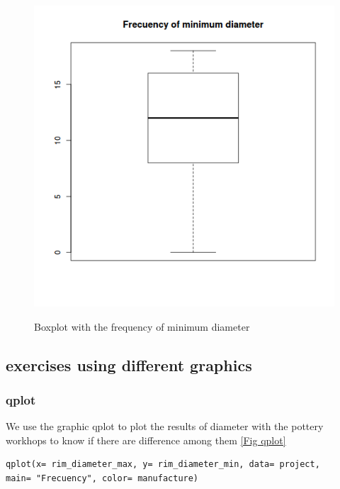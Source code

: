 \documentclass[10pt,a4paper]{article}
\begin{document}
\begin{figure}[hdp]
\centering
\includegraphics[scale=0.30]{boxplotmin.png}
\label{boxmin}
\caption{Boxplot with the frequency of minimum diameter}
\end{figure} 



\subsection{exercises using different graphics}

\subsubsection{qplot}

We use the graphic qplot to plot the results of diameter with the pottery workhops to know if there are difference among them \ref{Fig qplot}

\begin{verbatim}
qplot(x= rim_diameter_max, y= rim_diameter_min, data= project, 
main= "Frecuency", color= manufacture) 
\end{verbatim}
\end{document}
